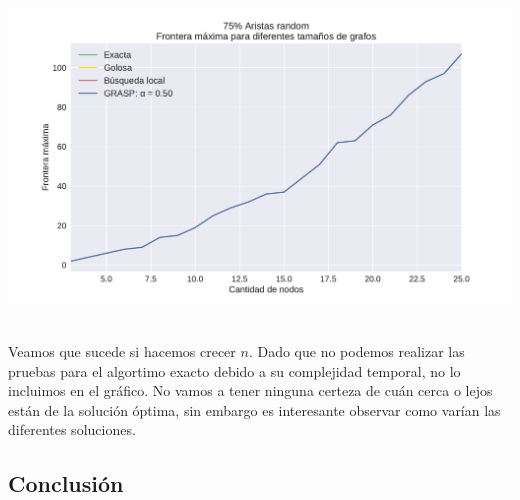 {\centering
    \includegraphics[width=1\textwidth]{informe/imgs/exp_random75_frontera_todos_v2.pdf}
}
$ $ \newline
$ $ \newline

Veamos que sucede si hacemos crecer $n$. Dado que no podemos realizar las pruebas para el algortimo exacto debido a su complejidad temporal, no lo incluimos en el gráfico. No vamos a tener ninguna certeza de cuán cerca o lejos están de la solución óptima, sin embargo es interesante observar como varían las diferentes soluciones.


\subsection{Conclusión}


